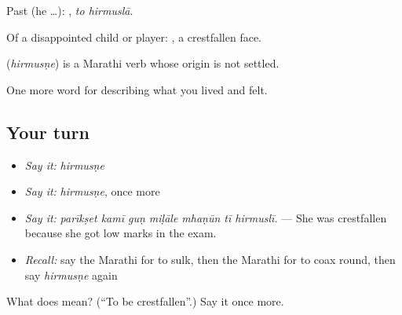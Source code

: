 Past (he …):  , \emph{to hirmuslā}.

Of a disappointed child or player:  , a crestfallen face.

\begin{cousinweb}
\textbf{} (\emph{hirmusṇe}) is a Marathi verb whose origin is not settled.
\end{cousinweb}

\begin{grammarlens}[title={What you've built}]
One more word for describing what you lived and felt.
\end{grammarlens}

\subsection*{Your turn}
\begin{itemize}
\raggedright
  \item \emph{Say it:} \emph{hirmusṇe}
  \item \emph{Say it:} \emph{hirmusṇe}, once more
  \item \emph{Say it:} \emph{parīkṣet kamī guṇ miḷāle mhaṇūn tī hirmuslī.} — She was crestfallen because she got low marks in the exam.
  \item \emph{Recall:} say the Marathi for to sulk, then the Marathi for to coax round, then say \emph{hirmusṇe} again
\end{itemize}

\begin{tcolorbox}[breakable,colback=teal!4,colframe=teal!35!black,title={Before you move on}]
What does  mean? (\textquotedblleft{}To be crestfallen\textquotedblright{}.) Say it once more.
\end{tcolorbox}
